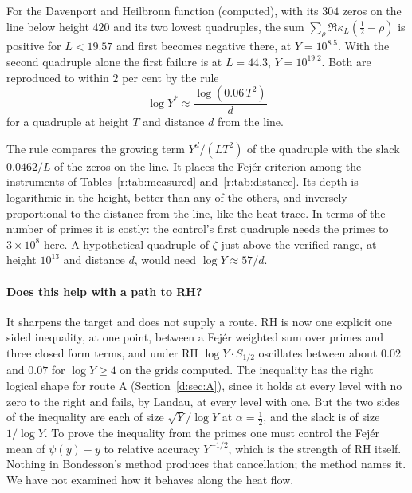 \begin{computation}\label{bo:comp:fejerdh}
For the Davenport and Heilbronn function (computed), with its $304$ zeros on the line below height $420$ and its two lowest quadruples, the sum $\sum_\rho\Re\kappa_L(\frac12-\rho)$ is positive for $L<19.57$ and first becomes negative there, at $Y=10^{8.5}$. With the second quadruple alone the first failure is at $L=44.3$, $Y=10^{19.2}$. Both are reproduced to within $2$ per cent by the rule
\[
\log Y^*\approx\frac{\log(0.06\,T^2)}{d}
\]
for a quadruple at height $T$ and distance $d$ from the line.
\end{computation}

The rule compares the growing term $Y^{d}/(LT^2)$ of the quadruple with the slack $0.0462/L$ of the zeros on the line. It places the Fej\'er criterion among the instruments of Tables~\ref{r:tab:measured} and~\ref{r:tab:distance}. Its depth is logarithmic in the height, better than any of the others, and inversely proportional to the distance from the line, like the heat trace. In terms of the number of primes it is costly: the control's first quadruple needs the primes to $3\times10^8$ here. A hypothetical quadruple of $\zeta$ just above the verified range, at height $10^{13}$ and distance $d$, would need $\log Y\approx57/d$.

\paragraph{Does this help with a path to RH?} It sharpens the target and does not supply a route. RH is now one explicit one sided inequality, at one point, between a Fej\'er weighted sum over primes and three closed form terms, and under RH $\log Y\cdot S_{1/2}$ oscillates between about $0.02$ and $0.07$ for $\log Y\ge4$ on the grids computed. The inequality has the right logical shape for route A (Section~\ref{d:sec:A}), since it holds at every level with no zero to the right and fails, by Landau, at every level with one. But the two sides of the inequality are each of size $\sqrt Y/\log Y$ at $\alpha=\frac12$, and the slack is of size $1/\log Y$. To prove the inequality from the primes one must control the Fej\'er mean of $\psi(y)-y$ to relative accuracy $Y^{-1/2}$, which is the strength of RH itself. Nothing in Bondesson's method produces that cancellation; the method names it. We have not examined how it behaves along the heat flow.

